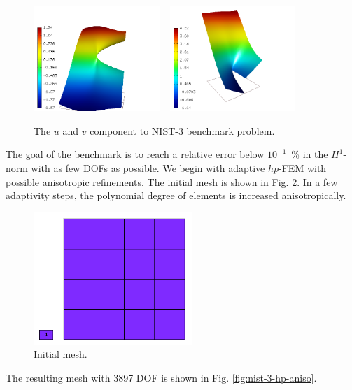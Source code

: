 \begin{figure}[!ht]
\centering
\includegraphics[height=40mm]{nist/nist-3/solution-u.png}\ \
\includegraphics[height=40mm]{nist/nist-3/solution-v.png}
\vspace{-2mm}
\caption{The $u$ and $v$ component to NIST-3 benchmark problem.}
\label{fig:sln-nist03}
\end{figure}

The goal of the benchmark is to reach a relative error below
$10^{-1}$~\% in the $H^1$-norm with as few DOFs as possible.
We begin with adaptive $hp$-FEM with possible anisotropic refinements.
The initial mesh is shown in Fig. \ref{fig:nist-3-hp-aniso-init}.
In a few adaptivity steps, the polynomial degree of elements is increased
anisotropically.

\begin{figure}[!ht]
\centering
\includegraphics[height=5cm]{nist/nist-3/mesh_hp_aniso_init.png}
\caption{Initial mesh.}
\label{fig:nist-3-hp-aniso-init}
\end{figure}

The resulting mesh with 3897 DOF is shown in Fig. \ref{fig:nist-3-hp-aniso}.

